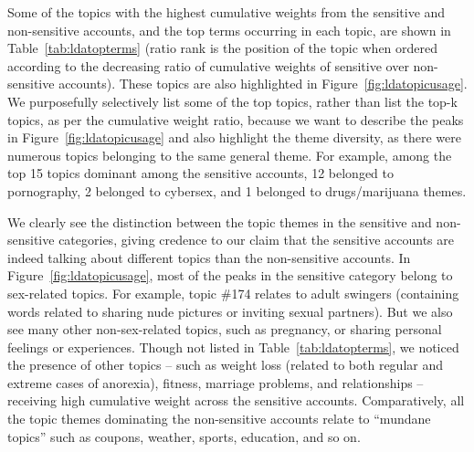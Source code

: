 \documentclass[conference]{IEEEtran}
\begin{document}
Some of the topics with the highest cumulative weights from the sensitive and non-sensitive accounts, and the top terms occurring in each topic, are shown in Table~\ref{tab:ldatopterms} (ratio rank is the position of the topic when ordered according to the decreasing ratio of cumulative weights of sensitive over non-sensitive accounts). These topics are also highlighted in Figure~\ref{fig:ldatopicusage}. We purposefully selectively list some of the top topics, rather than list the top-k topics, as per the cumulative weight ratio, because we want to describe the peaks in Figure~\ref{fig:ldatopicusage} and also highlight the theme diversity, as there were numerous topics belonging to the same general theme. For example, among the top 15 topics dominant among the sensitive accounts, 12 belonged to pornography, 2 belonged to cybersex, and 1 belonged to drugs/marijuana themes.


We clearly see the distinction between the topic themes in the sensitive and non-sensitive categories, giving credence to our claim that the sensitive accounts are indeed talking about different topics than the non-sensitive accounts. 
In Figure~\ref{fig:ldatopicusage}, most of the peaks in the sensitive category belong to sex-related topics. For example, topic \#174 relates to adult swingers (containing words related to sharing nude pictures or inviting sexual partners). But we also see many other non-sex-related topics, such as pregnancy, or sharing personal feelings or experiences. Though not listed in Table~\ref{tab:ldatopterms}, we noticed the presence of other topics -- such as weight loss (related to both regular and extreme cases of anorexia), fitness, marriage problems, and relationships -- receiving high cumulative weight across the sensitive accounts. Comparatively, all the topic themes dominating the non-sensitive accounts relate to ``mundane topics'' such as coupons, weather, sports, education, and so on.
\end{document}

